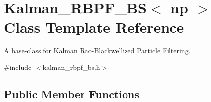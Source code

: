 \hypertarget{classKalman__RBPF__BS}{}\section{Kalman\+\_\+\+R\+B\+P\+F\+\_\+\+BS$<$ np $>$ Class Template Reference}
\label{classKalman__RBPF__BS}


A base-\/class for Kalman Rao-\/\+Blackwellized Particle Filtering.  




{\ttfamily \#include $<$kalman\+\_\+rbpf\+\_\+bs.\+h$>$}

\subsection*{Public Member Functions}
